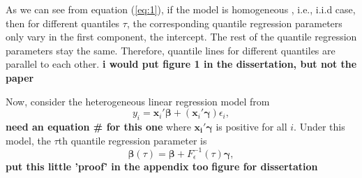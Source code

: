 \documentclass[12pt]{article}
\DeclareMathOperator{\pr}{p}
\begin{document}
As we can see from equation (\ref{eq:1}), if the model is homogeneous
, i.e., i.i.d case, then for different quantiles $\tau$, the
corresponding quantile regression parameters only vary in the
first component, the intercept. The rest of the quantile regression
parameters stay the same. Therefore, quantile lines for different
quantiles are parallel to each other. 
{\bf i would put figure 1 in the dissertation, but not the paper}


Now, consider the heterogeneous linear regression model  from \citet{he1998}  
\begin{equation}\label{eq:8}
  y_i = \bm{x}_i'\bm{\beta} + (\bm{x}_i'\bm{\gamma}) \epsilon_i, 
\end{equation}
{\bf need an equation \# for this one}
where $\bm{x_i'\gamma}$ is positive  for all
$i$. Under this model, the $\tau$th quantile regression parameter is 
\begin{equation}\label{eq:2}
  \bm{\beta}(\tau) = \bm{\beta} + F^{-1}_{\epsilon}(\tau) \bm{\gamma},
\end{equation}
{\bf put this little 'proof' in the appendix too} %
{\bf figure for dissertation}
\end{document}
